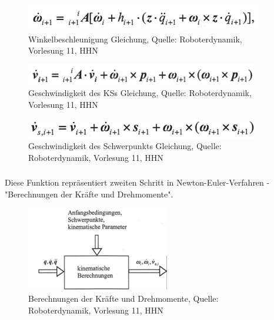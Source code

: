 	\begin{figure}[!htbp]
		\centering
		\includegraphics[width=1\linewidth]{grafic/omega_dot_gleichung}
		\caption{Winkelbeschleunigung Gleichung, Quelle: Roboterdynamik, Vorlesung 11, HHN}
		\label{fig:omega_dot_gleichung}
	\end{figure}

	\begin{figure}[!htbp]
		\centering
		\includegraphics[width=1\linewidth]{grafic/v_dot_gleichung}
		\caption{Geschwindigkeit des KSs Gleichung, Quelle: Roboterdynamik, Vorlesung 11, HHN}
		\label{fig:v_dot_gleichung}
	\end{figure}

	\begin{figure}[!htbp]
		\centering
		\includegraphics[width=1\linewidth]{grafic/vs_dot_gleichung}
		\caption{Geschwindigkeit des Schwerpunkts Gleichung, Quelle: Roboterdynamik, Vorlesung 11, HHN}
		\label{fig:vs_dot_gleichung}
	\end{figure}


\subsubsection{}

Diese Funktion repräsentiert zweiten Schritt in Newton-Euler-Verfahren - "Berechnungen der Kräfte und Drehmomente".

	\begin{figure}[!htbp]
		\centering
		\includegraphics[width=1\linewidth]{grafic/compute_kinematics_diagramm}
		\caption{Berechnungen der Kräfte und Drehmomente, Quelle: Roboterdynamik, Vorlesung 11, HHN}
		\label{fig:sensoren_subsystem}
	\end{figure}

